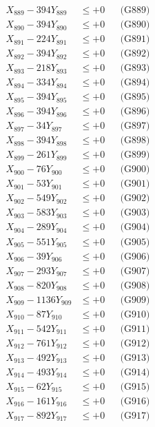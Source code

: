 \documentclass[a4paper,10pt]{article}
\begin{document}
{\begin{align}
X_{889} - 394Y_{889} &\leq +0 && \text{(G889)} \\
X_{890} - 394Y_{890} &\leq +0 && \text{(G890)} \\
\allowbreak
X_{891} - 224Y_{891} &\leq +0 && \text{(G891)} \\
X_{892} - 394Y_{892} &\leq +0 && \text{(G892)} \\
X_{893} - 218Y_{893} &\leq +0 && \text{(G893)} \\
X_{894} - 334Y_{894} &\leq +0 && \text{(G894)} \\
X_{895} - 394Y_{895} &\leq +0 && \text{(G895)} \\
X_{896} - 394Y_{896} &\leq +0 && \text{(G896)} \\
X_{897} - 34Y_{897} &\leq +0 && \text{(G897)} \\
X_{898} - 394Y_{898} &\leq +0 && \text{(G898)} \\
X_{899} - 261Y_{899} &\leq +0 && \text{(G899)} \\
X_{900} - 76Y_{900} &\leq +0 && \text{(G900)} \\
\allowbreak
X_{901} - 53Y_{901} &\leq +0 && \text{(G901)} \\
X_{902} - 549Y_{902} &\leq +0 && \text{(G902)} \\
X_{903} - 583Y_{903} &\leq +0 && \text{(G903)} \\
X_{904} - 289Y_{904} &\leq +0 && \text{(G904)} \\
X_{905} - 551Y_{905} &\leq +0 && \text{(G905)} \\
X_{906} - 39Y_{906} &\leq +0 && \text{(G906)} \\
X_{907} - 293Y_{907} &\leq +0 && \text{(G907)} \\
X_{908} - 820Y_{908} &\leq +0 && \text{(G908)} \\
X_{909} - 1136Y_{909} &\leq +0 && \text{(G909)} \\
X_{910} - 87Y_{910} &\leq +0 && \text{(G910)} \\
\allowbreak
X_{911} - 542Y_{911} &\leq +0 && \text{(G911)} \\
X_{912} - 761Y_{912} &\leq +0 && \text{(G912)} \\
X_{913} - 492Y_{913} &\leq +0 && \text{(G913)} \\
X_{914} - 493Y_{914} &\leq +0 && \text{(G914)} \\
X_{915} - 62Y_{915} &\leq +0 && \text{(G915)} \\
X_{916} - 161Y_{916} &\leq +0 && \text{(G916)} \\
X_{917} - 892Y_{917} &\leq +0 && \text{(G917)} \\

\end{align}}
\end{document}
